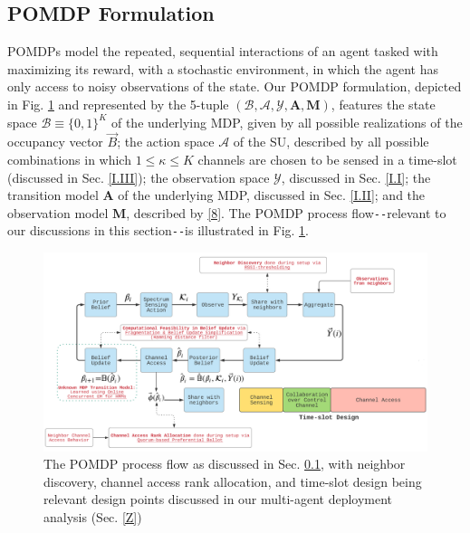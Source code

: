 \documentclass[10pt, twocolumn]{IEEEtran}
\begin{document}
\subsection{POMDP Formulation}\label{II.0}
POMDPs model the repeated, sequential interactions of an agent tasked with maximizing its reward, with a stochastic environment, in which the agent has only access to noisy observations of the state. Our POMDP formulation, depicted in Fig. \ref{fig: A.add-1} and
represented by the 5-tuple $(\mathcal{B},\mathcal{A},\mathcal{Y},\mathbf{A},\mathbf{M})$, features the state space $\mathcal{B}{\equiv}\{0,1\}^{K}$ of the underlying MDP, given by all possible realizations of the occupancy vector $\vec{B}$; the action space $\mathcal{A}$ of the SU, described by all possible combinations in which $1{\leq}\kappa{\leq}K$ channels are chosen to be sensed in a time-slot (discussed in Sec. \ref{I.III}); the observation space $\mathcal{Y}$, discussed in Sec. \ref{I.I}; the transition model $\mathbf{A}$ of the underlying MDP, discussed in Sec. \ref{I.II}; and the observation model $\mathbf{M}$, described by \eqref{8}. The POMDP process flow\texttt{-{}-}relevant to our discussions in this section\texttt{-{}-}is illustrated in Fig. \ref{fig: A.add-1}.
\begin{figure} [t]
    \centerline{
    \includegraphics[width=0.8\linewidth]{figures/POMDP_MultiAgent_Model.PNG}}
    \vspace{-2mm}
    \caption{The POMDP process flow as discussed in Sec. \ref{II.0}, with neighbor discovery, channel access rank allocation, and time-slot design being relevant design points discussed in our multi-agent deployment analysis (Sec. \ref{Z})}
    \vspace{-5mm}
    \label{fig: A.add-1}
\end{figure}
\end{document}
